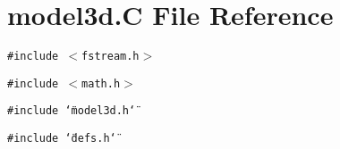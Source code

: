 \section{model3d.C File Reference}
\label{model3d_C}
{\tt \#include $<$fstream.h$>$}\par
{\tt \#include $<$math.h$>$}\par
{\tt \#include \char`\"{}model3d.h\char`\"{}}\par
{\tt \#include \char`\"{}defs.h\char`\"{}}\par

